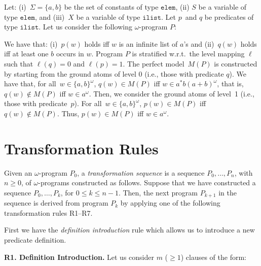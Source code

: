 \documentclass[english]{tlp}
\begin{document}
\begin{example}\label{ex:omega_prog}
Let: (i)~$\Sigma\!=\!\{a,b\}$ be the set of constants of type
${\texttt{elem}}$, (ii) $S$ be a variable of type
${\texttt{elem}}$, and (iii)~$X$ be a variable of type
${\texttt{ilist}}$. Let $p$~and $q$ be predicates of type
${\texttt{ilist}}$. Let us consider the
following $\omega$-program $P$:

\smallskip


\smallskip

\noindent We have that: (i)~$p(w)$ holds iff $w$ is an infinite list of $a$'s 
and (ii)~$q(w)$ holds iff at least one $b$ occurs in $w$.
Program $P$ is  stratified w.r.t.~the level mapping $\ell$ such that
$\ell(q)\!=\!0$ and {\mbox{$\ell(p)\!=\!1$}}. 
The perfect model~$M(P)$ is constructed by
starting from the ground atoms of level 0 (i.e., those with predicate
$q$). We have that, for all~$w\in\{a,b\}^{\omega}$,
$q(w)\! \in\! M(P)$ iff  $w\!\in\! a^* b (a\!+\!b)^\omega$, that is, 
$q(w)\! \not \in \!M(P)$ iff  $w\!\in\! a^\omega$. Then, we
consider the ground atoms of level~1 (i.e., those with predicate~$p$). 
For all~$w\!\in\!\{a,b\}^{\omega}$, $p(w)\!\in \!M(P)$ iff $q(w)\!\not\in\! M(P)$.
Thus, $p(w)\! \in\! M(P)$ iff $w\!\in\! a^\omega$. 
\end{example}



\section{Transformation Rules\label{sec:rules}}

Given an $\omega$-program $P_0$, a \emph{transformation sequence} is a sequence
$P_{0},\ldots,P_{n}$, with $n\!\geq\!0$, of \mbox{$\omega$-programs} 
constructed as follows. Suppose that we have constructed a sequence
$P_{0},\ldots,P_{k}$, for $0\! \leq \! k\! \leq \! n\! -\! 1 $. Then, the next
program $P_{k+1}$ in the sequence is derived from program $P_{k}$
by applying one of the following transformation rules \mbox{R1--R7}.

First we have the \emph{definition introduction} rule which allows
us to introduce a new predicate definition.

\medskip

\noindent \textbf{R1. Definition Introduction.} Let us consider \( m
\) (\( \geq \! 1 \)) clauses of the form:
\smallskip{}
\end{document}
